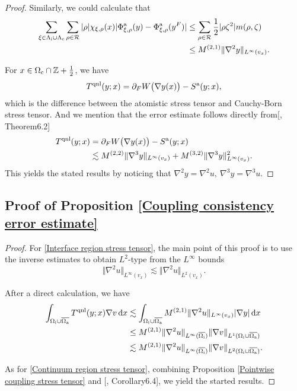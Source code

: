 \begin{proof}
	Similarly, we could calculate that
	\begin{align*}
		\sum_{\xi \in\Lambda_{\rm i}\cup\Lambda_{\rm c}} \sum_{\rho \in \mathcal{R}} \vert\rho \vert\chi_{\xi,\rho}(x) \vert \Phi^{{\rm a}}_{\xi,\rho}(y)-\Phi^{{\rm a}}_{\xi,\rho}(y^{F}) \vert &\le \sum_{\rho \in \mathcal{R}} \frac{1}{2} \vert \rho \zeta^{2}\vert m(\rho,\zeta) \\
		&\le M^{(2,1)} \Vert \nabla^{2}y\Vert_{L^{\infty}(v_{x})}.
	\end{align*}
	
	For $x\in \Omega_{{\rm c}} \cap \mathbb{Z}+\frac{1}{2}$, we have
	\begin{equation*}
		T^{{\rm qnl}}(y;x) = \partial_{F}W\big(\nabla y(x)\big)-S^{{\rm a}}(y;x),
	\end{equation*}
	which is the difference between the atomistic stress tensor and Cauchy-Born stress tensor. And we mention that the error estimate follows directly from[\cite{2013_ML_CO_AC_Coupling_ACTANUM}, Theorem6.2]
	\begin{align*}
		T^{{\rm qnl}}(y;x) &= \partial_{F}W\big(\nabla y(x)\big)-S^{{\rm a}}(y;x)\\
		&\lesssim M^{(2,2)}\Vert \nabla^{3}y\Vert_{L^{\infty}(v_{x})}+M^{(3,2)}\Vert \nabla^{3}y\Vert_{L^{\infty}(v_{x})}^{2}.
	\end{align*}
	This yields the stated results by noticing that $\nabla^{2}y =\nabla^{2}u,\ \nabla^{3}y=\nabla^{3}u$.
\end{proof}

\subsection{Proof of Proposition \ref{Coupling consistency error estimate}}\label{Appendix section 2}
\begin{proof}
	For \eqref{Interface region stress tensor}, the main point of this proof is to use the inverse estimates to obtain $L^{2}$-type from the $L^{\infty}$ bounds~\cite{2007_DB_FEM}
	\begin{equation}\label{L-infty to L-2 estimate}
		\Vert \nabla^{2}u\Vert_{L^{\infty}(v_{x})}\lesssim \Vert \nabla^{2}u\Vert_{L^{2}(v_{x})}.
	\end{equation}
	
	After a direct calculation, we have
	\begin{align*}
		\int_{\Omega_{{\rm i}}\cup\overline{\Omega_{{\rm a}}}}T^{{\rm qnl}}(y;x)\nabla v\,\text{d} x&\lesssim \int_{\Omega_{{\rm i}}\cup\overline{\Omega_{{\rm a}}}} M^{(2,1)}\Vert \nabla^{2}u\Vert_{L^{\infty}(v_{x})} \vert \nabla y \vert \,\text{d} x\\
		&\le M^{(2,1)}\Vert \nabla^{2}u\Vert_{L^{\infty}(\overline{\Omega_{{\rm i}}})}\Vert \nabla v \Vert_{L^{1}(\Omega_{{\rm i}}\cup\overline{\Omega_{{\rm a}}})}\\
		&\lesssim  M^{(2,1)}\Vert \nabla^{2}u\Vert_{L^{\infty}(\overline{\Omega_{{\rm i}}})}\Vert \nabla v \Vert_{L^{2}(\Omega_{{\rm i}}\cup\overline{\Omega_{{\rm a}}})}.
	\end{align*}
	
	As for \eqref{Continuum region stress tensor}, combining Proposition \ref{Pointwise coupling stress tensor} and [\cite{2013_ML_CO_AC_Coupling_ACTANUM}, Corollary6.4], we yield the started results.
\end{proof}


